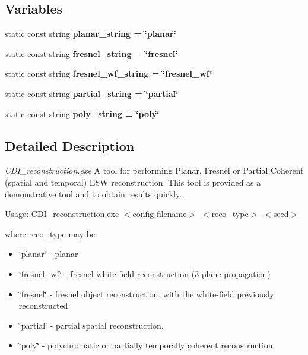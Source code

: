 \subsection*{Variables}
\begin{CompactItemize}
\item 
static const string \bf{planar\_\-string} = \char`\"{}planar\char`\"{}\label{CDI__reconstruction_8c_978d2982a16e4b93a5bf7ead17b6f625}

\item 
static const string \bf{fresnel\_\-string} = \char`\"{}fresnel\char`\"{}\label{CDI__reconstruction_8c_a238c64d671d656d47ba84e893078f64}

\item 
static const string \bf{fresnel\_\-wf\_\-string} = \char`\"{}fresnel\_\-wf\char`\"{}\label{CDI__reconstruction_8c_ff96b6bfc4bdf22e4c3ee3d86bc66b64}

\item 
static const string \bf{partial\_\-string} = \char`\"{}partial\char`\"{}\label{CDI__reconstruction_8c_2b9da71283dc070f2b66093a03798ab6}

\item 
static const string \bf{poly\_\-string} = \char`\"{}poly\char`\"{}\label{CDI__reconstruction_8c_5373d32c9d79ff9bb5112bc5c867b474}

\end{CompactItemize}


\subsection{Detailed Description}
{\em CDI\_\-reconstruction.exe\/} A tool for performing Planar, Fresnel or Partial Coherent (spatial and temporal) ESW reconstruction. This tool is provided as a demonstrative tool and to obtain results quickly.

\begin{Desc}
\item[Usage: CDI\_\-reconstruction.exe $<$config filename$>$ $<$reco\_\-type$>$ $<$seed$>$]\end{Desc}
where reco\_\-type may be:\begin{itemize}
\item \char`\"{}planar\char`\"{} - planar\item \char`\"{}fresnel\_\-wf\char`\"{} - fresnel white-field reconstruction (3-plane propagation)\item \char`\"{}fresnel\char`\"{} - fresnel object reconstruction. with the white-field previously reconstructed.\item \char`\"{}partial\char`\"{} - partial spatial reconstruction.\item \char`\"{}poly\char`\"{} - polychromatic or partially temporally coherent reconstruction.\end{itemize}


